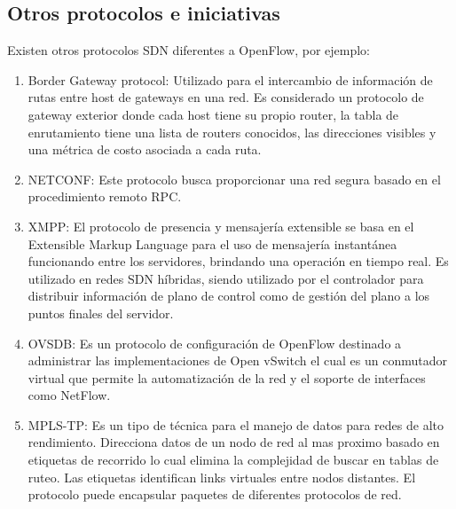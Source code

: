 \documentclass[10pt,journal,compsoc]{IEEEtran}
\begin{document}
\subsection{Otros protocolos e iniciativas}
Existen otros protocolos SDN diferentes a OpenFlow, por ejemplo:
\begin{enumerate}
    \item Border Gateway protocol:  Utilizado para el intercambio de información de rutas entre host de gateways en una red. Es considerado un protocolo de gateway exterior donde cada host tiene su propio router, la tabla de enrutamiento tiene una lista de routers conocidos, las direcciones visibles y una métrica de costo asociada a cada ruta. 
    \item NETCONF: Este protocolo busca proporcionar una red segura basado en el procedimiento remoto RPC. 
    \item XMPP: El protocolo de presencia y mensajería extensible se basa en el Extensible Markup Language para el uso de mensajería instantánea funcionando entre los servidores, brindando una operación en tiempo real. Es utilizado en redes SDN híbridas, siendo utilizado por el controlador para distribuir información de plano de control como de gestión del plano a los puntos finales del servidor.
    \item OVSDB: Es un protocolo de configuración de OpenFlow destinado a administrar las implementaciones de Open vSwitch el cual es un conmutador virtual que permite la automatización de la red y el soporte de interfaces como NetFlow.
    \item MPLS-TP: Es un tipo de técnica para el manejo de datos para redes de alto rendimiento. Direcciona datos de un nodo de red al mas proximo basado en etiquetas de recorrido lo cual elimina la complejidad de buscar en tablas de ruteo. Las etiquetas identifican links virtuales entre nodos distantes. El protocolo puede encapsular paquetes de diferentes protocolos de red.
\end{enumerate}





%
%
\end{document}
